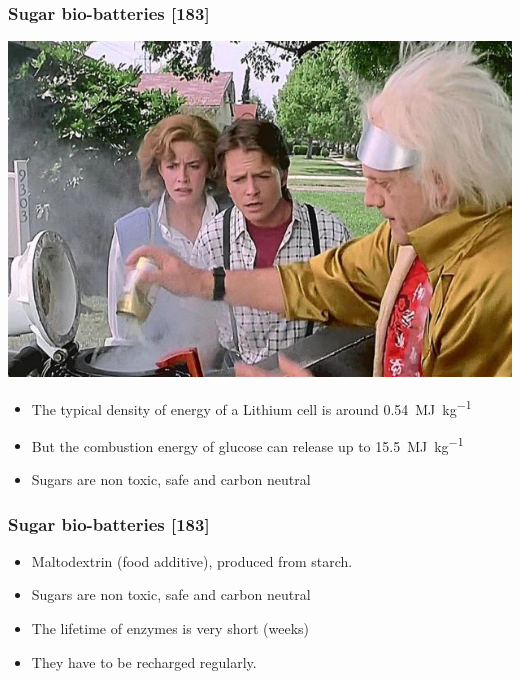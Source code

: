 \documentclass[a4paper,11pt,handout]{beamer}
\begin{document}
\begin{frame}
\frametitle{Sugar bio-batteries [183]}

	\begin{center}
	\includegraphics[scale=0.3]{trash.jpg}
	\end{center}

\begin{itemize}

	\item The typical density of energy of a Lithium cell is around 
	\SI{0.54}{\mega\joule\per\kilogram}

	\item But the combustion energy of glucose can release up to 
	\SI{15.5}{\mega\joule\per\kilogram}

	\item Sugars are non toxic, safe and carbon neutral

\end{itemize}
\end{frame}
\begin{frame}
\frametitle{Sugar bio-batteries [183]}

\begin{itemize}

	\item Maltodextrin (food additive), produced from starch.
	\item Sugars are non toxic, safe and carbon neutral
	\item The lifetime of enzymes is very short (weeks)
	\item They have to be recharged regularly.

\end{itemize}
\end{frame}
\end{document}
